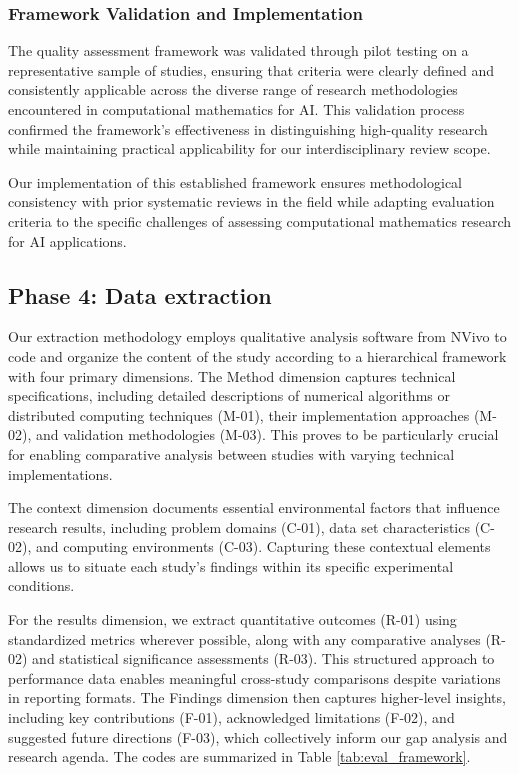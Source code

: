 \documentclass[acmsmall]{acmart}
\begin{document}
\subsubsection{Framework Validation and Implementation}\label{subsubsec:phase-3-quality-assessment:framework-validation-and-implementation}
The quality assessment framework was validated through pilot testing on a representative sample of studies, ensuring that criteria were clearly defined and consistently applicable across the diverse range of research methodologies encountered in computational mathematics for AI. This validation process confirmed the framework's effectiveness in distinguishing high-quality research while maintaining practical applicability for our interdisciplinary review scope.

Our implementation of this established framework ensures methodological consistency with prior systematic reviews in the field while adapting evaluation criteria to the specific challenges of assessing computational mathematics research for AI applications.

\subsection{Phase 4: Data extraction}\label{subsec:phase-4-data-extraction}
Our extraction methodology employs qualitative analysis software from NVivo \citep{kitchenham2007guidelines} to code and organize the content of the study according to a hierarchical framework with four primary dimensions. The Method dimension captures technical specifications, including detailed descriptions of numerical algorithms or distributed computing techniques (M-01), their implementation approaches (M-02), and validation methodologies (M-03). This proves to be particularly crucial for enabling comparative analysis between studies with varying technical implementations.

The context dimension documents essential environmental factors that influence research results, including problem domains (C-01), data set characteristics (C-02), and computing environments (C-03). Capturing these contextual elements allows us to situate each study's findings within its specific experimental conditions.

For the results dimension, we extract quantitative outcomes (R-01) using standardized metrics wherever possible, along with any comparative analyses (R-02) and statistical significance assessments (R-03). This structured approach to performance data enables meaningful cross-study comparisons despite variations in reporting formats. The Findings dimension then captures higher-level insights, including key contributions (F-01), acknowledged limitations (F-02), and suggested future directions (F-03), which collectively inform our gap analysis and research agenda. The codes are summarized in Table \cref{tab:eval_framework}.
\end{document}
